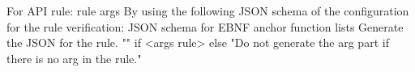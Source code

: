 For {{API}}
rule: {{rule}}
{{args}}
By using the following JSON schema of the configuration for the rule verification:
{{JSON schema for EBNF}}
{{anchor function lists}}
Generate the JSON for the rule. {"" if <args rule> else "Do not generate the arg part if there is no arg in the rule."}